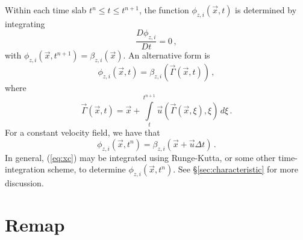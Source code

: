 \documentclass[11pt]{report}
\newcommand{\mDeriv}[1]{\frac{D {#1}}{D t}}
\newcommand{\svec}[1]{{\Vec{#1}}}
\begin{document}
Within each time slab $t^n \le t \le t^{n+1}$, the function
$\phi_{z,i}(\svec{x},t)$ is determined by integrating
\begin{equation}
  \label{eq:advectPhi}
  \mDeriv{\phi_{z,i}} = 0\,,
\end{equation}
with $\phi_{z,i}(\svec{x},t^{n+1}) = \beta_{z,i}(\svec{x})$.  An alternative
form is
\begin{equation}
  \label{eq:phiChar2}
   \phi_{z,i}(\svec{x},t) = \beta_{z,i}(\svec{\Gamma}(\svec{x},t))\,,
\end{equation}
where
\begin{equation}
  \label{eq:xc}
  \svec{\Gamma}(\svec{x}, t) = \svec{x} + \int\limits_{t}^{t^{n+1}} 
            \svec{u}(\svec{\Gamma}(\svec{x},\xi), \xi) \, d\xi\,.
\end{equation}
For a constant velocity field, we have that
\begin{equation}
  \phi_{z,i}(\svec{x},t^n) = \beta_{z,i}(\svec{x} + \svec{u} \Delta t)\,.
\end{equation}
In general, (\ref{eq:xc}) may be integrated using Runge-Kutta, or some
other time-integration scheme, to determine $\phi_{z,i}(\svec{x},t^{n})$.
See \S\ref{sec:characteristic} for more discussion.

\section{Remap}
\label{sec:remap}
\end{document}
